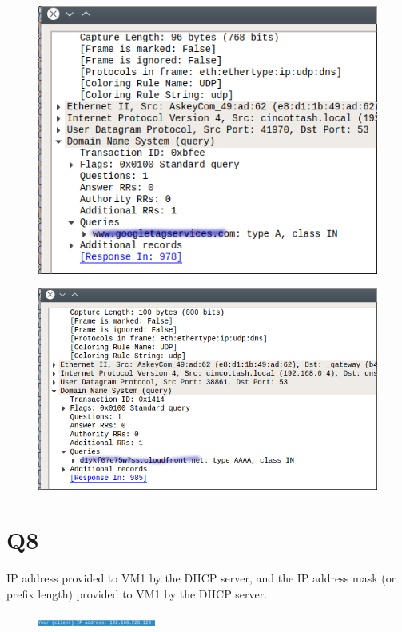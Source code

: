 \documentclass{article}
\begin{document}
\begin{figure}[h!]
\centering
\includegraphics[scale=0.4]{Q7b.png}
\caption{}
\end{figure}

\begin{figure}[h!]
\centering
\includegraphics[scale=0.4]{Q7c.png}
\caption{}
\end{figure}
\clearpage

\section*{Q8}
IP address provided to VM1 by the DHCP server, and the IP address mask (or prefix length) provided to VM1 by the DHCP server.\\
\begin{figure}[h!]
\centering
\includegraphics[scale=1.0]{Q8a.png}
\caption{}
\end{figure}
\end{document}
